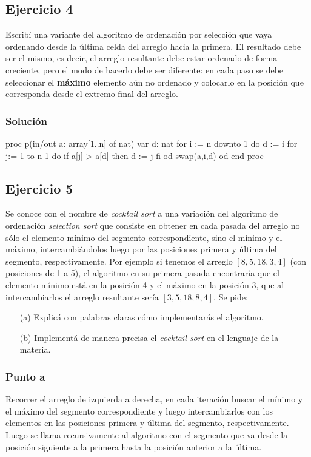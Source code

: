 \newpage
\subsection{Ejercicio 4}
Escribí una variante del algoritmo de ordenación por selección que vaya ordenando desde la última celda del arreglo hacia la primera. El resultado debe ser el mismo, es decir, el arreglo resultante debe estar ordenado de forma creciente, pero el modo de hacerlo debe ser diferente: en cada paso se debe seleccionar el \textbf{máximo} elemento aún no ordenado y colocarlo en la posición que corresponda desde el extremo final del arreglo.
\subsubsection{Solución}
\begin{codebox}
\begin{pascallike}
proc p(in/out a: array[1..n] of nat)
    var d: nat
    for i := n downto 1 do
        d := i
        for j:= 1 to n-1 do
            if a[j] > a[d] then
                d := j
            fi
        od
        swap(a,i,d)
    od
end proc 
\end{pascallike}
\end{codebox}

\subsection{Ejercicio 5}
Se conoce con el nombre de \textit{cocktail sort} a una variación del algoritmo de ordenación \textit{selection sort} que consiste en obtener en cada pasada del arreglo no sólo el elemento mínimo del segmento correspondiente, sino el mínimo y el máximo, intercambiándolos luego por las posiciones primera y última del segmento, respectivamente. Por ejemplo si tenemos el arreglo $[8,5,18,3,4]$ (con posiciones de 1 a 5), el algoritmo en su primera pasada encontraría que el elemento mínimo está en la posición 4 y el máximo en la posición 3, que al intercambiarlos el arreglo resultante sería $[3,5,18,8,4]$. Se pide:
\begin{itemize}
    \item[(a)] Explicá con palabras claras cómo implementarás el algoritmo.
    \item[(b)] Implementá de manera precisa el \textit{cocktail sort} en el lenguaje de la materia.
\end{itemize}

\subsubsection{Punto a}
Recorrer el arreglo de izquierda a derecha, en cada iteración buscar el mínimo y el máximo del segmento correspondiente y luego intercambiarlos con los elementos en las posiciones primera y última del segmento, respectivamente. Luego se llama recursivamente al algoritmo con el segmento que va desde la posición siguiente a la primera hasta la posición anterior a la última.


